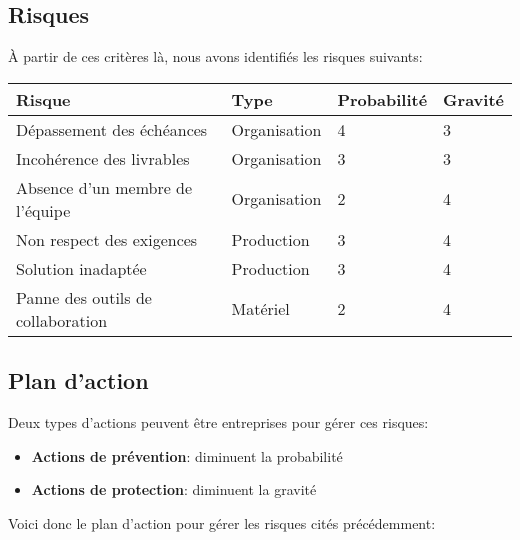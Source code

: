\subsection*{Risques}

À partir de ces critères là, nous avons identifiés les risques suivants:

\begin{tabular}{|l||l|l|l|}
   \hline	
	   \textbf{Risque} & \textbf{Type} & \textbf{Probabilité} & \textbf{Gravité} \\ \hline \hline
	   Dépassement des échéances         & Organisation & 4 & 3  \\ \hline
	   Incohérence des livrables         & Organisation & 3 & 3  \\ \hline
  	   Absence d'un membre de l'équipe   & Organisation & 2 & 4  \\ \hline
	   Non respect des exigences         & Production   & 3 & 4  \\ \hline
	   Solution inadaptée                & Production   & 3 & 4  \\ \hline
	   Panne des outils de collaboration & Matériel     & 2 & 4  \\
   \hline
\end{tabular}

\subsection*{Plan d'action}

Deux types d'actions peuvent être entreprises pour gérer ces risques:

\begin{itemize}
  \item \textbf{Actions de prévention}: diminuent la probabilité 
  \item \textbf{Actions de protection}: diminuent la gravité 
\end{itemize}

Voici donc le plan d'action pour gérer les risques cités précédemment:

